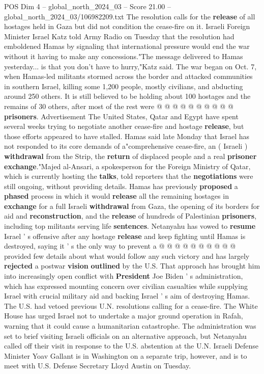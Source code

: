 \begin{textsample}{POS Dim 4 – global\_north\_2024\_03 – Score 21.00 – global\_north\_2024\_03/106982209.txt}
The resolution calls for the \textbf{release} of all hostages held in Gaza but did not condition the cease-fire on it.
Israeli Foreign Minister Israel Katz told Army Radio on Tuesday that the resolution had emboldened Hamas by signaling that international pressure would end the war without it having to make any concessions."The message delivered to Hamas yesterday... is that you don't have to hurry,"Katz said.
The war began on Oct. 7, when Hamas-led militants stormed across the border and attacked communities in southern Israel, killing some 1,200 people, mostly civilians, and abducting around 250 others.
It is still believed to be holding about 100 hostages and the remains of 30 others, after most of the rest were @ @ @ @ @ @ @ @ @ @ \textbf{prisoners}.
Advertisement The United States, Qatar and Egypt have spent several weeks trying to negotiate another cease-fire and hostage \textbf{release}, but those efforts appeared to have stalled.
Hamas said late Monday that Israel has not responded to its core demands of a"comprehensive cease-fire, an ( Israeli ) \textbf{withdrawal} from the Strip, the \textbf{return} of displaced people and a real \textbf{prisoner} \textbf{exchange}."Majed al-Ansari, a spokesperson for the Foreign Ministry of Qatar, which is currently hosting the \textbf{talks}, told reporters that the \textbf{negotiations} were still ongoing, without providing details.
Hamas has previously \textbf{proposed} a \textbf{phased} process in which it would \textbf{release} all the remaining hostages in \textbf{exchange} for a full Israeli \textbf{withdrawal} from Gaza, the opening of its borders for aid and \textbf{reconstruction}, and the \textbf{release} of hundreds of Palestinian \textbf{prisoners}, including top militants serving life \textbf{sentences}.
Netanyahu has vowed to \textbf{resume} Israel ' s offensive after any hostage \textbf{release} and keep fighting until Hamas is destroyed, saying it ' s the only way to prevent a @ @ @ @ @ @ @ @ @ @ provided few details about what would follow any such victory and has largely \textbf{rejected} a postwar \textbf{vision} \textbf{outlined} by the U.S.
That approach has brought him into increasingly open conflict with \textbf{President} Joe Biden ' s administration, which has expressed mounting concern over civilian casualties while supplying Israel with crucial military aid and backing Israel ' s aim of destroying Hamas.
The U.S. had vetoed previous U.N. resolutions calling for a cease-fire.
The White House has urged Israel not to undertake a major ground operation in Rafah, warning that it could cause a humanitarian catastrophe.
The administration was set to brief visiting Israeli officials on an alternative approach, but Netanyahu called off their visit in response to the U.S. abstention at the U.N.
Israeli Defense Minister Yoav Gallant is in Washington on a separate trip, however, and is to meet with U.S.
Defense Secretary Lloyd Austin on Tuesday.

\end{textsample}
